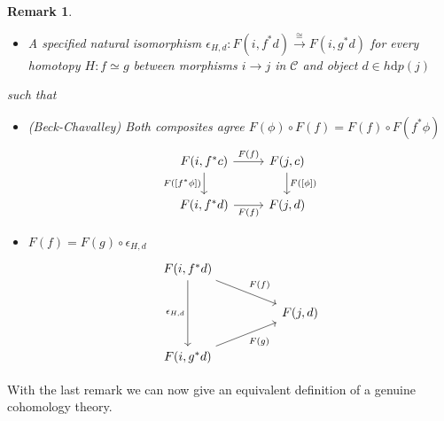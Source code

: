 \documentclass{article}
\newcommand{\xto}{\xrightarrow}
\newcommand{\cC}{\mathcal{C}}
\newtheorem{remark}{Remark}
\begin{document}
\begin{remark}
\begin{itemize}
    \item A specified natural isomorphism $\epsilon_{H,d} \colon F(i,f^*d) \xto{\cong} F(i, g^*d)$ for every homotopy $H \colon f \simeq g$ between morphisms 
    $ i \to j $ in $\cC$ and object $d \in h {\mathrm{d}} p(j)$
  \end{itemize}
  such that 
  \begin{itemize}
    \item (Beck-Chavalley) Both composites agree $F(\phi) \circ F(f) = F(f) \circ F(f^*\phi)$
    \[\begin{tikzcd}
      {F(i,f^*c)} & {F(j, c)} \\
      {F(i,f^*d)} & {F(j,d)}
      \arrow["{F([f^*\phi])}"', from=1-1, to=2-1]
      \arrow["{F(f)}"', from=2-1, to=2-2]
      \arrow["{F(f)}", from=1-1, to=1-2]
      \arrow["{F([\phi])}", from=1-2, to=2-2]
    \end{tikzcd}\]
    \item $F(f) = F(g) \circ \epsilon_{H,d}$
    \[\begin{tikzcd}
      {F(i,f^*d)} \\
      && {F(j,d)} \\
      {F(i,g^*d)}
      \arrow["{\epsilon_{H,d}}"', from=1-1, to=3-1]
      \arrow["{F(f)}", from=1-1, to=2-3]
      \arrow["{F(g)}"', from=3-1, to=2-3]
    \end{tikzcd}\]
  \end{itemize}
  \end{remark}
  With the last remark we can now give an equivalent definition of a 
  genuine cohomology theory. 
  
\end{document}
